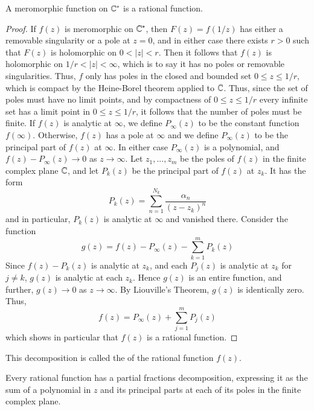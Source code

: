 \documentclass[12pt, a4paper, oneside, openright, titlepage]{book}
\begin{document}
\begin{thm}
    A meromorphic function on $\mathbb C^*$ is a rational function.
\end{thm}
\begin{proof}
    If $f(z)$ is meromorphic on $\mathbb C^*$, then $F(z) = f(1/z)$ has either a removable singularity or a pole at $z = 0$, and in either case there exists $r > 0$ such that $F(z)$ is holomorphic on $0 < |z| < r$. Then it follows that $f(z)$ is holomorphic on $1/r < |z| < \infty$, which is to say it has no poles or removable singularities. Thus, $f$ only has poles in the closed and bounded set $0\leq z \leq 1/r$, which is compact by the Heine-Borel theorem applied to $\mathbb C$. Thus, since the set of poles must have no limit points, and by compactness of $0\leq z \leq 1/r$ every infinite set has a limit point in $0 \leq z \leq 1/r$, it follows that the number of poles must be finite. If $f(z)$ is analytic at $\infty$, we define $P_{\infty}(z)$ to be the constant function $f(\infty)$. Otherwise, $f(z)$ has a pole at $\infty$ and we define $P_{\infty}(z)$ to be the principal part of $f(z)$ at $\infty$. In either case $P_{\infty}(z)$ is a polynomial, and $f(z) - P_{\infty}(z)\rightarrow 0$ as $z\rightarrow \infty$. Let $z_1,...,z_m$ be the poles of $f(z)$ in the finite complex plane $\mathbb C$, and let $P_k(z)$ be the principal part of $f(z)$ at $z_k$. It has the form \begin{equation*}
        P_k(z) = \sum_{n=1}^{N_k}\frac{\alpha_n}{(z-z_k)^n}
    \end{equation*}
    and in particular, $P_k(z)$ is analytic at $\infty$ and vanished there. Consider the function \begin{equation*}
        g(z) = f(z) - P_{\infty}(z) - \sum_{k=1}^mP_k(z)
    \end{equation*}
    Since $f(z)-P_k(z)$ is analytic at $z_k$, and each $P_j(z)$ is analytic at $z_k$ for $j \neq k$, $g(z)$ is analytic at each $z_k$. Hence $g(z)$ is an entire function, and further, $g(z)\rightarrow 0$ as $z\rightarrow \infty$. By Liouville's Theorem, $g(z)$ is identically zero. Thus, \begin{equation*}
        f(z) = P_{\infty}(z) + \sum_{j=1}^mP_j(z)
    \end{equation*}
    which shows in particular that $f(z)$ is a rational function.
\end{proof}

This decomposition is called the  of the rational function $f(z)$. 


\begin{thm}
    Every rational function has a partial fractions decomposition, expressing it as the sum of a polynomial in $z$ and its principal parts at each of its poles in the finite complex plane.
\end{thm}
\end{document}
